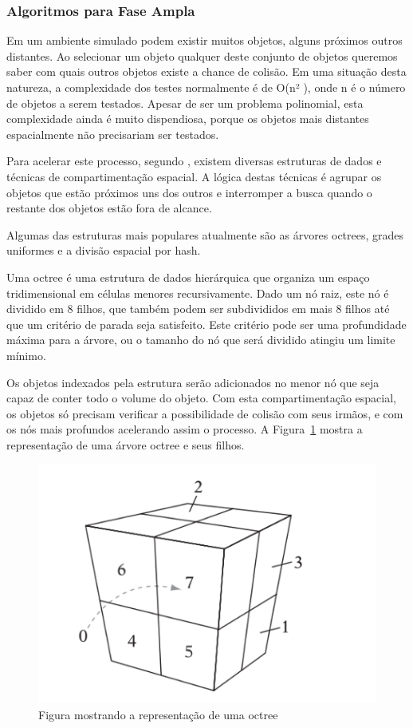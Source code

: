 \subsubsection{Algoritmos para Fase Ampla}
Em um ambiente simulado podem existir muitos objetos, alguns próximos outros distantes. 
Ao selecionar um objeto qualquer deste conjunto de objetos queremos saber com quais outros objetos existe a chance de colisão. 
Em uma situação desta natureza, a complexidade dos testes normalmente é de O(n² ), onde n é o número de objetos a serem
testados. Apesar de ser um problema polinomial, esta complexidade ainda é muito dispendiosa, porque os objetos mais distantes espacialmente não precisariam ser testados.

Para acelerar este processo, segundo , existem diversas estruturas de dados e técnicas de compartimentação espacial. 
A lógica destas técnicas é agrupar os objetos que estão próximos uns dos outros e interromper a busca quando o restante dos objetos estão fora de alcance.

Algumas das estruturas mais populares atualmente são as árvores octrees, grades uniformes e a divisão espacial por hash.


Uma octree é uma estrutura de dados hierárquica que organiza um espaço
tridimensional em células menores recursivamente.
Dado um nó raiz, este nó é dividido em 8  filhos, que também podem ser
subdivididos em mais 8 filhos até que um critério de parada seja satisfeito.
Este critério pode ser uma profundidade máxima para a árvore, ou o tamanho do
nó que será dividido atingiu um limite mínimo.

Os objetos indexados pela estrutura serão adicionados no menor nó que seja capaz de conter todo o volume do objeto.
Com esta compartimentação espacial, os objetos só precisam verificar a possibilidade de colisão com seus irmãos, e com os nós mais profundos acelerando assim o processo. A Figura~\ref{fig:figura1} mostra a representação de uma árvore octree e seus filhos.
\begin{figure}[htb]
  \centering
	\caption{\label{fig:figura1} Figura mostrando a representação de uma octree}
	\includegraphics[scale=0.5]{Imagens/Figura_7.10.png} %
\end{figure}

